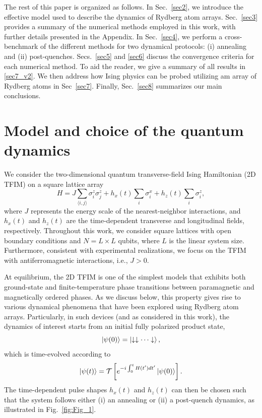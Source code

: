 \documentclass[aps,pra,reprint,amssymb,superscriptaddress]{revtex4-2}
\begin{document}
The rest of this paper is organized as follows. In Sec.~\ref{sec2}, we introduce the effective model used to describe the dynamics of Rydberg atom arrays. Sec.~\ref{sec3} provides a summary of the numerical methods employed in this work, with further details presented in the Appendix. In Sec.~\ref{sec4}, we perform a cross-benchmark of the different methods for two dynamical protocols: (i) annealing and (ii) post-quenches. Secs.~\ref{sec5} and \ref{sec6} discuss the convergence criteria for each numerical method.
To aid the reader, we give a summary of all results in \ref{sec7_v2}.
We then address how Ising physics can be probed utilizing am array of Rydberg atoms in Sec~\ref{sec7}. Finally, Sec.~\ref{sec8} summarizes our main conclusions.

\section{ \label{sec2} Model and choice of the quantum dynamics}

We consider the two-dimensional quantum transverse-field Ising Hamiltonian (2D TFIM) on a square lattice array
\begin{equation}
H= J\sum_{\langle i,j \rangle}\sigma^z_i\sigma^z_j + h_{x}(t) \sum_i \sigma^x_i + h_{z}(t) \sum_{i}  \sigma^z_i,
\label{eq:H}
\end{equation}
where $J$ represents the energy scale of the nearest-neighbor interactions, and $h_{x}(t)$ and $h_{z}(t)$ are the time-dependent transverse and longitudinal fields, respectively. 
Throughout this work, we consider square lattices with open boundary conditions and $N = L \times L$ qubits, where $L$ is the linear system size. 
Furthermore, consistent with experimental realizations, we focus on the TFIM with antiferromagnetic interactions, i.e., $J>0$.

At equilibrium, the 2D TFIM is one of the simplest models that exhibits both ground-state and finite-temperature phase transitions between paramagnetic and magnetically ordered phases. 
As we discuss below, this property gives rise to various dynamical phenomena that have been explored using  Rydberg atom arrays. 
Particularly, in such devices (and as considered in this work), the dynamics of interest starts from an initial fully polarized product state,  
\begin{equation}
\ket{\psi(0)} = \ket{\downarrow \downarrow \cdots \downarrow},
  \label{initState}
\end{equation}
which is time-evolved according to
\begin{equation}
\ket{\psi(t)} =  {\cal T} \left[ e^{-i   \int_0^{t}  H(t^{\prime}) d t^{\prime}} \ket{\psi(0)} \right].
\label{eq:time_evol}
\end{equation}
The time-dependent pulse shapes $h_{x}(t)$ and $h_{z}(t)$ can then be chosen such that the system follows either (i) an annealing or (ii) a post-quench dynamics, as illustrated in Fig.~\ref{fig:Fig_1}.
\end{document}
